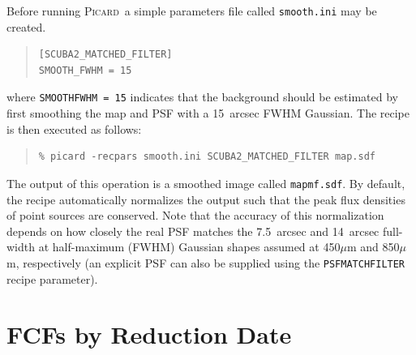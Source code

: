 \documentclass[twoside,11pt]{article}
\newcommand{\xref}[3]{#1}
\newcommand{\xlabel}[1]{}
\renewcommand{\_}{\texttt{\symbol{95}}}
\newenvironment{myquote}{\begin{quote}\begin{small}}{\end{small}\end{quote}}
\newcommand{\picard}{\xref{\textsc{Picard}}{sun265}{}}
\newcommand{\param}[1]{\texttt{#1}}
\begin{document}
Before running \picard\, a simple parameters file called \texttt{smooth.ini}
may be created.
\begin{myquote}
\begin{verbatim}
[SCUBA2_MATCHED_FILTER]
SMOOTH_FWHM = 15
\end{verbatim}
\end{myquote}
%
where \texttt{SMOOTH\_FWHM = 15} indicates that the background should
be estimated by first smoothing the map and PSF with a 15~arcsec FWHM
Gaussian. The recipe is then executed as follows:
%
\begin{myquote}
\begin{verbatim}
% picard -recpars smooth.ini SCUBA2_MATCHED_FILTER map.sdf
\end{verbatim}
\end{myquote}
%
The output of this operation is a smoothed image called
\texttt{map\_mf.sdf}. By default, the recipe automatically normalizes
the output such that the peak flux densities of point sources are
conserved. Note that the accuracy of this normalization depends on how
closely the real PSF matches the 7.5~arcsec and 14~arcsec full-width
at half-maximum (FWHM) Gaussian shapes assumed at 450$\mu$m and
850$\mu$m, respectively (an explicit PSF can also be supplied using
the \param{PSF\_MATCHFILTER} recipe parameter).



\section{\xlabel{fcfsred}FCFs by Reduction Date}
\label{app:fcfs}
\end{document}
